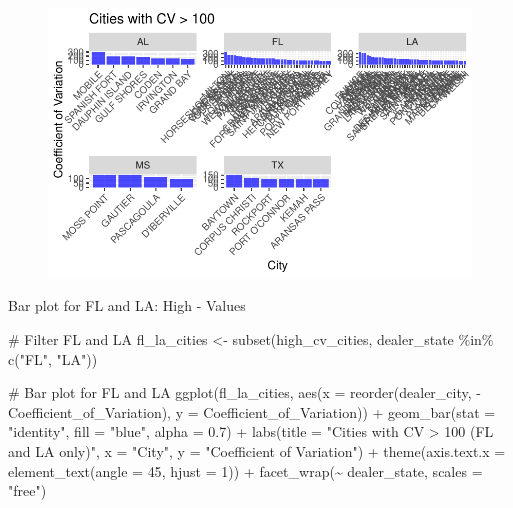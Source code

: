 \documentclass[
  letterpaper,
  DIV=11,
  numbers=noendperiod]{scrartcl}
\newenvironment{Shaded}{\begin{snugshade}}{\end{snugshade}}
\newcommand{\AttributeTok}[1]{\textcolor[rgb]{0.40,0.45,0.13}{#1}}
\newcommand{\CommentTok}[1]{\textcolor[rgb]{0.37,0.37,0.37}{#1}}
\newcommand{\DecValTok}[1]{\textcolor[rgb]{0.68,0.00,0.00}{#1}}
\newcommand{\FloatTok}[1]{\textcolor[rgb]{0.68,0.00,0.00}{#1}}
\newcommand{\FunctionTok}[1]{\textcolor[rgb]{0.28,0.35,0.67}{#1}}
\newcommand{\NormalTok}[1]{\textcolor[rgb]{0.00,0.23,0.31}{#1}}
\newcommand{\OtherTok}[1]{\textcolor[rgb]{0.00,0.23,0.31}{#1}}
\newcommand{\SpecialCharTok}[1]{\textcolor[rgb]{0.37,0.37,0.37}{#1}}
\newcommand{\StringTok}[1]{\textcolor[rgb]{0.13,0.47,0.30}{#1}}
\begin{document}
\begin{figure}[H]

{\centering \includegraphics{CV_Communities2_files/figure-pdf/unnamed-chunk-9-1.pdf}

}

\end{figure}

Bar plot for FL and LA: High - Values

\begin{Shaded}
\begin{Highlighting}[]
\CommentTok{\# Filter FL and LA}
\NormalTok{fl\_la\_cities }\OtherTok{\textless{}{-}} \FunctionTok{subset}\NormalTok{(high\_cv\_cities, dealer\_state }\SpecialCharTok{\%in\%} \FunctionTok{c}\NormalTok{(}\StringTok{"FL"}\NormalTok{, }\StringTok{"LA"}\NormalTok{))}

\CommentTok{\# Bar plot for FL and LA}
\FunctionTok{ggplot}\NormalTok{(fl\_la\_cities, }\FunctionTok{aes}\NormalTok{(}\AttributeTok{x =} \FunctionTok{reorder}\NormalTok{(dealer\_city, }\SpecialCharTok{{-}}\NormalTok{Coefficient\_of\_Variation), }\AttributeTok{y =}\NormalTok{ Coefficient\_of\_Variation)) }\SpecialCharTok{+}
  \FunctionTok{geom\_bar}\NormalTok{(}\AttributeTok{stat =} \StringTok{"identity"}\NormalTok{, }\AttributeTok{fill =} \StringTok{"blue"}\NormalTok{, }\AttributeTok{alpha =} \FloatTok{0.7}\NormalTok{) }\SpecialCharTok{+}
  \FunctionTok{labs}\NormalTok{(}\AttributeTok{title =} \StringTok{"Cities with CV \textgreater{} 100 (FL and LA only)"}\NormalTok{, }\AttributeTok{x =} \StringTok{"City"}\NormalTok{, }\AttributeTok{y =} \StringTok{"Coefficient of Variation"}\NormalTok{) }\SpecialCharTok{+}
  \FunctionTok{theme}\NormalTok{(}\AttributeTok{axis.text.x =} \FunctionTok{element\_text}\NormalTok{(}\AttributeTok{angle =} \DecValTok{45}\NormalTok{, }\AttributeTok{hjust =} \DecValTok{1}\NormalTok{)) }\SpecialCharTok{+}
  \FunctionTok{facet\_wrap}\NormalTok{(}\SpecialCharTok{\textasciitilde{}}\NormalTok{ dealer\_state, }\AttributeTok{scales =} \StringTok{"free"}\NormalTok{)}
\end{Highlighting}
\end{Shaded}
\end{document}
